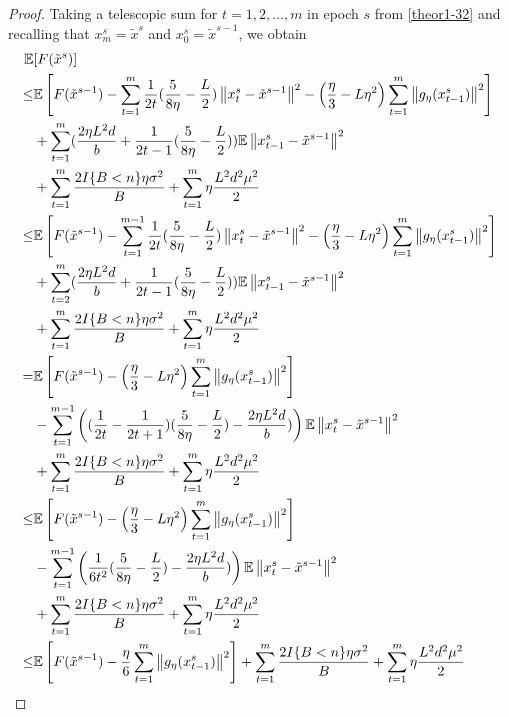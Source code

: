\documentclass{article}
\newcommand*{\E}{\mathbb{E}}
\newcommand{\norm}[1]{\left\lVert#1\right\rVert}
\theoremstyle{definition}
\theoremstyle{remark}
\begin{document}
\begin{proof}
Taking a telescopic sum for $t = 1, 2, \ldots, m$ in epoch $s$ from \eqref{theor1-32} and recalling that $x_m^s = \tilde{x}^s$ and $x_0^s = \tilde{x}^{s-1}$, we obtain
 \begin{align} 
\E&[F(\tilde{x}^s)] \notag
\\ \leq& \E\left[F(\tilde{x}^{s-1})  -\sum_{t=1}^m\frac{1}{2t}(\frac{5}{8\eta} - \frac{L}{2})\norm{{x}_t^s-\tilde{x}^{s-1}}^2- \left(\frac{\eta}{3}-L\eta^2\right)\sum_{t=1}^m\norm{g_{\eta}(x_{t-1}^s)}^2\right]\notag\\
&+\sum_{t=1}^m(\frac{2\eta L^2 d}{b}+\frac{1}{2t-1}(\frac{5}{8\eta} - \frac{L}{2}))\E\norm{x_{t-1}^s-\tilde{x}^{s-1}}^2\notag\\
&+ \sum_{t=1}^m \frac{2I\{B < n\}\eta \sigma ^2}{B}+\sum_{t=1}^m \eta \frac{L^2 d^2 \mu^2}{2}\notag\\
\leq& \E\left[F(\tilde{x}^{s-1})  -\sum_{t=1}^{m-1}\frac{1}{2t}(\frac{5}{8\eta} - \frac{L}{2})\norm{{x}_t^s-\tilde{x}^{s-1}}^2- \left(\frac{\eta}{3}-L\eta^2\right)\sum_{t=1}^m\norm{g_{\eta}(x_{t-1}^s)}^2\right]\notag\\
&+\sum_{t=2}^m(\frac{2\eta L^2 d}{b}+\frac{1}{2t-1}(\frac{5}{8\eta} - \frac{L}{2}))\E\norm{x_{t-1}^s-\tilde{x}^{s-1}}^2\notag\\
&+ \sum_{t=1}^m \frac{2I\{B < n\}\eta \sigma ^2}{B}+\sum_{t=1}^m \eta \frac{L^2 d^2 \mu^2}{2}\label{theor1-34}
\\
=& \E\left[F(\tilde{x}^{s-1}) - \left(\frac{\eta}{3}-L\eta^2\right)\sum_{t=1}^m\norm{g_{\eta}(x_{t-1}^s)}^2\right]\notag\\
&-\sum_{t=1}^{m-1}\left((\frac{1}{2t} - \frac{1}{2t+1})(\frac{5}{8\eta} - \frac{L}{2})-\frac{2\eta L^2 d}{b})\right)\E\norm{x_{t}^s-\tilde{x}^{s-1}}^2\notag\\
&+ \sum_{t=1}^m \frac{2I\{B < n\}\eta \sigma ^2}{B}+\sum_{t=1}^m \eta \frac{L^2 d^2 \mu^2}{2}\notag\\
\leq& \E\left[F(\tilde{x}^{s-1}) - \left(\frac{\eta}{3}-L\eta^2\right)\sum_{t=1}^m\norm{g_{\eta}(x_{t-1}^s)}^2\right]\notag\\
&-\sum_{t=1}^{m-1}\left(\frac{1}{6t^2}(\frac{5}{8\eta} - \frac{L}{2})-\frac{2\eta L^2 d}{b})\right)\E\norm{x_{t}^s-\tilde{x}^{s-1}}^2\notag\\
&+ \sum_{t=1}^m \frac{2I\{B < n\}\eta \sigma ^2}{B}+\sum_{t=1}^m \eta \frac{L^2 d^2 \mu^2}{2}\notag\\
\leq& \E\left[F(\tilde{x}^{s-1}) - \frac{\eta}{6}\sum_{t=1}^m\norm{g_{\eta}(x_{t-1}^s)}^2\right]+ \sum_{t=1}^m \frac{2I\{B < n\}\eta \sigma ^2}{B}+\sum_{t=1}^m \eta \frac{L^2 d^2 \mu^2}{2}\label{theor1-35}

\end{align}
\end{proof}
\end{document}
